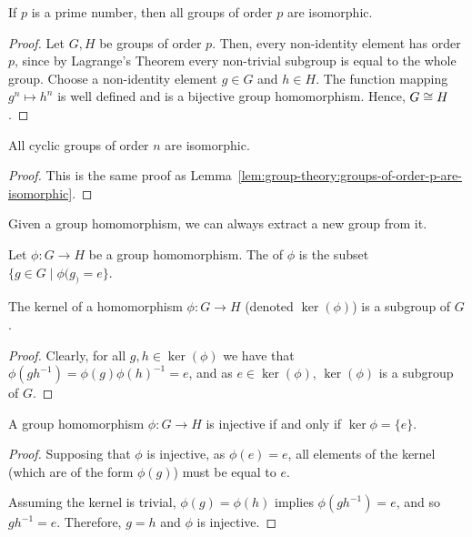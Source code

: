 \begin{lemma}
  \label{lem:group-theory:groups-of-order-p-are-isomorphic}
  If \(p\) is a prime number, then all groups of order \(p\) are isomorphic.
\end{lemma}

\begin{proof}
  Let \(G, H\) be groups of order \(p\).
  Then, every non-identity element has order \(p\), since by Lagrange's Theorem every non-trivial subgroup is equal to the whole group.
  Choose a non-identity element \(g \in G\) and \(h \in H\).
  The function mapping \(g^{n} \mapsto h^{n}\) is well defined and is a bijective group homomorphism.
  Hence, \(G \cong H\).
\end{proof}

\begin{lemma}
  All cyclic groups of order \(n\) are isomorphic.
\end{lemma}

\begin{proof}
  This is the same proof as Lemma~\ref{lem:group-theory:groups-of-order-p-are-isomorphic}.
\end{proof}


Given a group homomorphism, we can always extract a new group from it.

\begin{definition}
  Let \(\phi:G \to H\) be a group homomorphism.
  The  of \(\phi\) is the subset \(\{g \in G \mid \phi(g_) = e\}\).
\end{definition}

\begin{lemma}
\label{lem:group-theory:kernels-are-subgroups}
  The kernel of a homomorphism \(\phi : G \to H\) (denoted \(\ker(\phi)\)) is a subgroup of \(G\).
\end{lemma}

\begin{proof}
 Clearly, for all \(g, h \in \ker(\phi)\) we have that \(\phi(gh^{-1}) = \phi(g)\phi(h)^{-1} = e\), and as \(e \in \ker(\phi)\), \(\ker (\phi)\) is a subgroup of \(G\).
\end{proof}


\begin{lemma}
  A group homomorphism \(\phi : G \to H\) is injective if and only if \(\ker{\phi} = \{e\}\).
\end{lemma}

\begin{proof}
  Supposing that \(\phi\) is injective, as \(\phi(e) = e\), all elements of the kernel (which are of the form \(\phi(g)\)) must be equal to \(e\).

  Assuming the kernel is trivial, \(\phi(g) = \phi(h)\) implies \(\phi(gh^{-1}) = e\), and so \(gh^{-1} = e\).
  Therefore, \(g = h\) and \(\phi\) is injective.
\end{proof}

